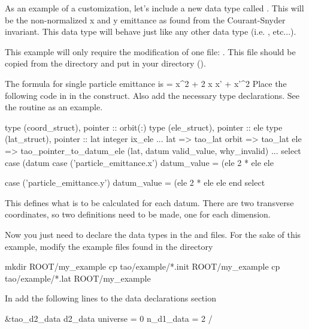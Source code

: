 {{{{As an example of a customization, let's include a new data type called
. This will be the non-normalized x and y
emittance as found from the Courant-Snyder invariant. This data type
will behave just like any other data type (i.e.  ,
 etc...). 

This example will only require the modification of one file:
. This file should be copied
from the  directory and put in your 
directory ().

The formula for single particle emittance is
\Begineq
  \epsilon = \gamma x^{2} + 2 \alpha x x' + \beta x'^{2}
  \label{e:emittance}
\Endeq
Place the following code in  in the
 construct. Also add the necessary type declarations. See the 
routine  as an example.
\begin{example}
  type (coord_struct), pointer :: orbit(:)
  type (ele_struct), pointer :: ele
  type (lat_struct), pointer :: lat
  integer ix_ele
  ...
  lat => tao_lat%
  orbit => tao_lat%
  ele => tao_pointer_to_datum_ele (lat, datum%
                                                          valid_value, why_invalid)
  ...
  select case (datum%
  case ('particle_emittance.x') 
    datum_value =  (ele%
		     2 * ele%
		     ele%
    
  case ('particle_emittance.y')
    datum_value = (ele%
		     2 * ele%
		     ele%
  end select
\end{example}
This defines what is to be calculated for each 
datum.  There are two transverse coordinates, so two definitions need
to be made, one for each dimension.

Now you just need to declare the data types in the  and
 files. For the sake of this example, modify the
example files found in the  directory
\begin{example}
	mkdir ROOT/my_example
  cp tao/example/*.init ROOT/my_example
  cp tao/example/*.lat ROOT/my_example
\end{example}

In  add the following lines to the data
declarations section
\begin{example}
  &tao_d2_data
    d2_data%
    universe = 0 
    n_d1_data = 2
  /


\end{example}}}}}
